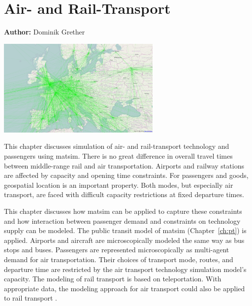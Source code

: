 \chapter{Air- and Rail-Transport}
\label{ch:air}

\hfill \textbf{Author:} Dominik Grether

\begin{center} \includegraphics[width=0.6\textwidth, angle=0]{extending/figures/air/air_network_europe_osm} \end{center}


This chapter discusses simulation of air- and rail-transport technology and passengers using \gls{matsim}. 
There is no great difference in overall travel times between middle-range rail and air transportation. 
Airports and railway stations are affected by capacity and opening time constraints. 
For passengers and goods, geospatial location is an important property. 
Both modes, but especially air transport, are faced with difficult capacity restrictions at fixed departure times. 

This chapter discusses how \gls{matsim} can be applied to capture these constraints and how interaction between passenger demand and constraints on technology supply can be modeled. 
The public transit model of \gls{matsim} (Chapter~\ref{ch:pt}) is applied. %
Airports and aircraft are microscopically modeled the same way as bus stops and buses. 
Passengers are represented microscopically as multi-agent demand for air transportation. 
Their choices of transport mode, routes, and departure time are restricted by the air transport technology simulation model's capacity. 
The modeling of rail transport is based on \gls{teleportation}. 
With appropriate data, the modeling approach for air transport could also be applied to rail transport \citep{Quick2012BARailTraffic}.  

